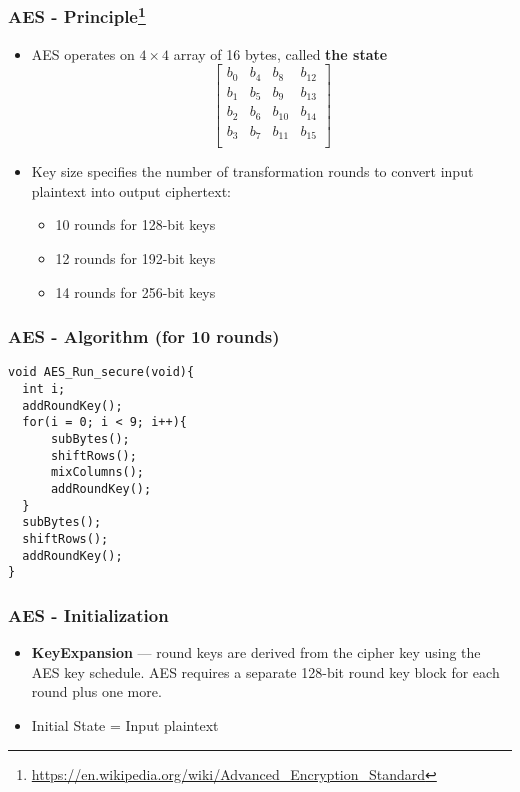 \documentclass[
hyperref={pdfpagelabels=false}
,xcolor=table
]
{beamer}
\begin{document}
\begin{frame}
  \frametitle{AES - Principle\footnote{\url{https://en.wikipedia.org/wiki/Advanced_Encryption_Standard}}}
  
  \begin{itemize}
  \item AES operates on $4\times 4$ array of 16 bytes, called \textbf{the state}
    \[
      \left[ {\begin{array}{cccc}
                b_0 & b_4 & b_8 & b_{12} \\ 
                b_1 & b_5 & b_9 & b_{13} \\ 
                b_2 & b_6 & b_{10} & b_{14} \\
                b_3 & b_7 & b_{11} & b_{15} \\ 
              \end{array} }
          \right]
        \]
      \item Key size specifies the number of transformation rounds to
        convert input plaintext into output ciphertext:
        \begin{itemize}
        \item 10 rounds for 128-bit keys
        \item 12 rounds for 192-bit keys
        \item 14 rounds for 256-bit keys
        \end{itemize}
      \end{itemize}
      
    \end{frame}


\begin{frame}[fragile]
  \frametitle{AES - Algorithm (for 10 rounds)}
\begin{verbatim}
void AES_Run_secure(void){
  int i;
  addRoundKey();
  for(i = 0; i < 9; i++){
      subBytes();
      shiftRows();
      mixColumns();
      addRoundKey();
  }
  subBytes();
  shiftRows();
  addRoundKey();
}
\end{verbatim}
\end{frame}

    
\begin{frame}[fragile]
  \frametitle{AES - Initialization}

  \begin{itemize}
  \item \textbf{KeyExpansion} --- round keys are derived from the
    cipher key using the AES key schedule. AES requires a separate
    128-bit round key block for each round plus one more.
  \item Initial State = Input plaintext
  \end{itemize}
\end{frame}
\end{document}
